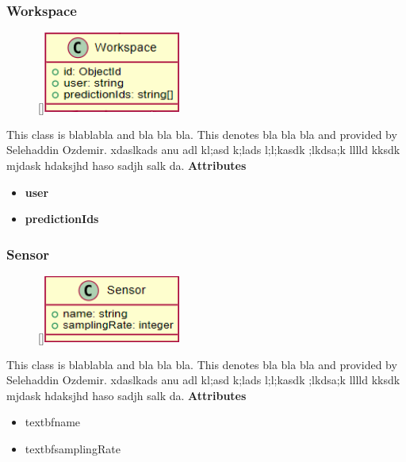 \subsubsection{Workspace}
\begin{figure}
    \raisebox{0pt}[\dimexpr{}\baselineskip\relax]{\includegraphics[width=4.5cm]{classes/model-management/2.png}}
\end{figure} 
\par
This class is blablabla and bla bla bla. This denotes bla bla bla and provided by Selehaddin Ozdemir. xdaslkads anu adl kl;asd k;lads l;l;kasdk ;lkdsa;k lllld kksdk mjdask hdaksjhd haso sadjh salk da.
\newline
\newline
\textbf{Attributes}
\begin{itemize}
    \item \textbf{user}
    \item \textbf{predictionIds}
\end{itemize}

\subsubsection{Sensor}
\begin{figure}
    \raisebox{0pt}[\dimexpr{}\baselineskip\relax]{\includegraphics[width=4.5cm]{classes/model-management/3.png}}
\end{figure} 
\par
This class is blablabla and bla bla bla. This denotes bla bla bla and provided by Selehaddin Ozdemir. xdaslkads anu adl kl;asd k;lads l;l;kasdk ;lkdsa;k lllld kksdk mjdask hdaksjhd haso sadjh salk da.
\newline
\newline
\textbf{Attributes}
\begin{itemize}
    \item textbf{name}
    \item textbf{samplingRate}
\end{itemize}


